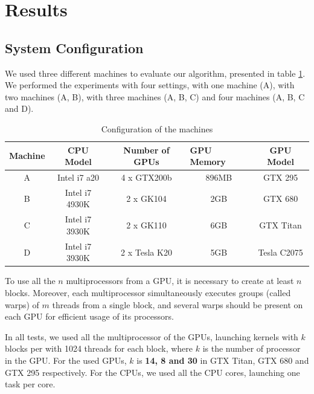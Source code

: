 \documentclass[journal]{IEEEtran}
\begin{document}
\section{Results}


\subsection{System Configuration}

We used three different machines to evaluate our algorithm, presented in table \ref{table: machines}. We performed the experiments with four settings, with one machine (A), with two machines (A, B), with three machines (A, B, C) and four machines (A, B, C and D). 


\begin{table}[!t]
\centering
\tiny
\caption{Configuration of the machines}

\begin{tabular}{|c|c|c|c|c|}
\hline
\multicolumn{1}{|l|}{Machine} & CPU Model & Number of GPUs & \multicolumn{1}{l|}{GPU Memory} & GPU Model\\ \hline
A                             & Intel i7 a20   & 4 x GTX200b         & 896MB                          & GTX 295   \\ \hline
B                             & Intel i7 4930K  & 2 x GK104           & 2GB                            & GTX 680   \\ \hline
C                             & Intel i7 3930K & 2 x GK110          & 6GB                            & GTX Titan \\ \hline
D                             & Intel i7 3930K & 2 x Tesla K20     & 5GB                            & Tesla C2075 \\ \hline
\end{tabular}
\label{table: machines}
\end{table}

To use all the $n$ multiprocessors from a GPU, it is necessary to create at least
$n$ blocks. Moreover, each multiprocessor simultaneously executes groups (called
warps) of $m$ threads from a single block, and several warps should be present
on each GPU for efficient usage of its processors.

In all tests, we used all the multiprocessor of the GPUs, launching kernels with
$k$ blocks per with 1024 threads for each block, where $k$ is the number of
processor in the GPU. For the used GPUs, $k$ is \textbf{14, 8 and 30} in GTX
Titan, GTX 680 and GTX 295 respectively. For the CPUs, we used all the CPU
cores, launching one task per core.
\end{document}
